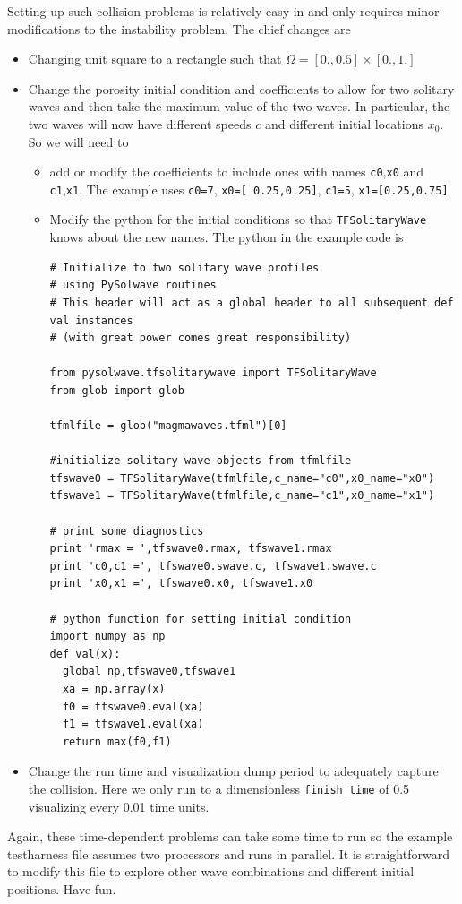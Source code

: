 Setting up such collision problems is relatively easy in \TF{} and
only requires minor modifications to the instability problem.  The
chief changes are
\begin{itemize}
\item Changing unit square to a rectangle such that
  $\Omega=[0.,0.5]\times[0.,1.]$
\item Change the porosity initial condition and coefficients to allow
  for two solitary waves and then take the maximum value of the two
  waves.  In particular,  the two waves will now have different speeds $c$
  and different initial locations $x_{0}$.  So we will need to
  \begin{itemize}
  \item add or modify the coefficients to include ones with names
    \texttt{c0},\texttt{x0} and \texttt{c1},\texttt{x1}.  The example
    uses \texttt{c0=7}, \texttt{x0=[ 0.25,0.25]}, \texttt{c1=5}, \texttt{x1=[0.25,0.75]}
  \item Modify the python for the initial conditions so that
    \texttt{TFSolitaryWave} knows about the new names.  The python in
    the example code is
    \begin{lstlisting}[style=python]
# Initialize to two solitary wave profiles 
# using PySolwave routines 
# This header will act as a global header to all subsequent def val instances
# (with great power comes great responsibility)

from pysolwave.tfsolitarywave import TFSolitaryWave
from glob import glob

tfmlfile = glob("magmawaves.tfml")[0]

#initialize solitary wave objects from tfmlfile
tfswave0 = TFSolitaryWave(tfmlfile,c_name="c0",x0_name="x0")
tfswave1 = TFSolitaryWave(tfmlfile,c_name="c1",x0_name="x1")

# print some diagnostics
print 'rmax = ',tfswave0.rmax, tfswave1.rmax
print 'c0,c1 =', tfswave0.swave.c, tfswave1.swave.c
print 'x0,x1 =', tfswave0.x0, tfswave1.x0

# python function for setting initial condition
import numpy as np
def val(x):
  global np,tfswave0,tfswave1
  xa = np.array(x)
  f0 = tfswave0.eval(xa)
  f1 = tfswave1.eval(xa)
  return max(f0,f1)
    \end{lstlisting}

  \end{itemize}
\item Change the run time and visualization dump period to adequately
  capture the collision. Here we only run to a dimensionless \texttt{finish\_time}
  of 0.5 visualizing every 0.01 time units.
\end{itemize}

Again, these time-dependent problems can take some time to run so the
example testharness file assumes two processors and runs in parallel.
It is straightforward to modify this file to explore other wave
combinations and different initial positions.  Have fun.

